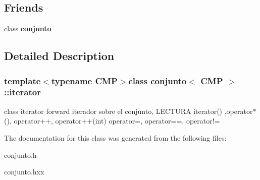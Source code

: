 \subsection*{Friends}
\begin{DoxyCompactItemize}
\item 
\hypertarget{classconjunto_1_1iterator_a42fdcda39c77eabd7380e29fcdbe5dd2}{}class {\bfseries conjunto}\label{classconjunto_1_1iterator_a42fdcda39c77eabd7380e29fcdbe5dd2}

\end{DoxyCompactItemize}


\subsection{Detailed Description}
\subsubsection*{template$<$typename C\+M\+P$>$class conjunto$<$ C\+M\+P $>$\+::iterator}

class iterator forward iterador sobre el conjunto, L\+E\+C\+T\+U\+R\+A iterator() ,operator$\ast$(), operator++, operator++(int) operator=, operator==, operator!= 

The documentation for this class was generated from the following files\+:\begin{DoxyCompactItemize}
\item 
conjunto.\+h\item 
conjunto.\+hxx\end{DoxyCompactItemize}
